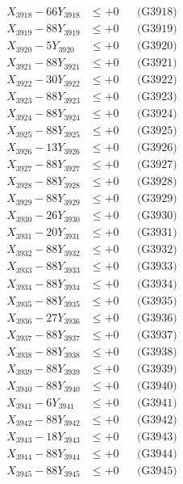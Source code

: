 \documentclass[a4paper,10pt]{article}
\begin{document}
{\begin{align}
X_{3918} - 66Y_{3918} &\leq +0 && \text{(G3918)} \\
X_{3919} - 88Y_{3919} &\leq +0 && \text{(G3919)} \\
X_{3920} - 5Y_{3920} &\leq +0 && \text{(G3920)} \\
\allowbreak
X_{3921} - 88Y_{3921} &\leq +0 && \text{(G3921)} \\
X_{3922} - 30Y_{3922} &\leq +0 && \text{(G3922)} \\
X_{3923} - 88Y_{3923} &\leq +0 && \text{(G3923)} \\
X_{3924} - 88Y_{3924} &\leq +0 && \text{(G3924)} \\
X_{3925} - 88Y_{3925} &\leq +0 && \text{(G3925)} \\
X_{3926} - 13Y_{3926} &\leq +0 && \text{(G3926)} \\
X_{3927} - 88Y_{3927} &\leq +0 && \text{(G3927)} \\
X_{3928} - 88Y_{3928} &\leq +0 && \text{(G3928)} \\
X_{3929} - 88Y_{3929} &\leq +0 && \text{(G3929)} \\
X_{3930} - 26Y_{3930} &\leq +0 && \text{(G3930)} \\
\allowbreak
X_{3931} - 20Y_{3931} &\leq +0 && \text{(G3931)} \\
X_{3932} - 88Y_{3932} &\leq +0 && \text{(G3932)} \\
X_{3933} - 88Y_{3933} &\leq +0 && \text{(G3933)} \\
X_{3934} - 88Y_{3934} &\leq +0 && \text{(G3934)} \\
X_{3935} - 88Y_{3935} &\leq +0 && \text{(G3935)} \\
X_{3936} - 27Y_{3936} &\leq +0 && \text{(G3936)} \\
X_{3937} - 88Y_{3937} &\leq +0 && \text{(G3937)} \\
X_{3938} - 88Y_{3938} &\leq +0 && \text{(G3938)} \\
X_{3939} - 88Y_{3939} &\leq +0 && \text{(G3939)} \\
X_{3940} - 88Y_{3940} &\leq +0 && \text{(G3940)} \\
\allowbreak
X_{3941} - 6Y_{3941} &\leq +0 && \text{(G3941)} \\
X_{3942} - 88Y_{3942} &\leq +0 && \text{(G3942)} \\
X_{3943} - 18Y_{3943} &\leq +0 && \text{(G3943)} \\
X_{3944} - 88Y_{3944} &\leq +0 && \text{(G3944)} \\
X_{3945} - 88Y_{3945} &\leq +0 && \text{(G3945)} \\

\end{align}}
\end{document}
